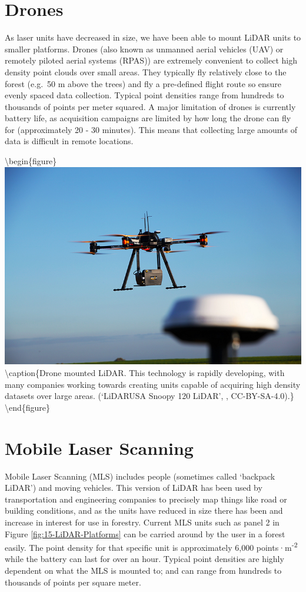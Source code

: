\documentclass[
]{book}
\begin{document}
\hypertarget{drones}{%
\section{Drones}\label{drones}}

As laser units have decreased in size, we have been able to mount LiDAR units to smaller platforms. Drones (also known as unmanned aerial vehicles (UAV) or remotely piloted aerial systems (RPAS)) are extremely convenient to collect high density point clouds over small areas. They typically fly relatively close to the forest (e.g.~50 m above the trees) and fly a pre-defined flight route so ensure evenly spaced data collection. Typical point densities range from hundreds to thousands of points per meter squared. A major limitation of drones is currently battery life, as acquisition campaigns are limited by how long the drone can fly for (approximately 20 - 30 minutes). This means that collecting large amounts of data is difficult in remote locations.

\textbackslash begin\{figure\}
\includegraphics[width=0.7\linewidth]{images/15-LiDAR-on-Drone} \textbackslash caption\{Drone mounted LiDAR. This technology is rapidly developing, with many companies working towards creating units capable of acquiring high density datasets over large areas. (`LiDARUSA Snoopy 120 LiDAR', \citet{mc_clapurhands_lidarusa_2019}, CC-BY-SA-4.0).\}\label{fig:15-LiDAR-on-Drone}
\textbackslash end\{figure\}

\hypertarget{mobile-laser-scanning}{%
\section{Mobile Laser Scanning}\label{mobile-laser-scanning}}

Mobile Laser Scanning (MLS) includes people (sometimes called `backpack LiDAR') and moving vehicles. This version of LiDAR has been used by transportation and engineering companies to precisely map things like road or building conditions, and as the units have reduced in size there has been and increase in interest for use in forestry. Current MLS units such as panel 2 in Figure \ref{fig:15-LiDAR-Platforms} can be carried around by the user in a forest easily. The point density for that specific unit is approximately 6,000 points·m\textsuperscript{-2} while the battery can last for over an hour. Typical point densities are highly dependent on what the MLS is mounted to; and can range from hundreds to thousands of points per square meter.
\end{document}
